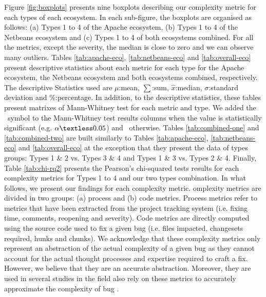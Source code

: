 Figure \ref{fig:boxplots} presents nine boxplots describing our complexity metric for each types of each ecosystem.
In each sub-figure, the boxplots are organised as follows: (a) Types 1 to 4 of the Apache ecosystem, (b) Types 1 to 4 of the Netbeans ecosystem and (c) Types 1 to 4 of both ecosystems combined.
For all the metrics, except the severity, the median is close to zero and we can observe many outliers.
Tables \ref{tab:apache-eco}, \ref{tab:netbeans-eco} and \ref{tab:overall-eco} present descriptive statistics about each metric for each type for the Apache ecosystem, the Netbeans ecosystem and both ecosystems combined, respectively.
The descriptive Statistics used are $\mu$:mean, $\sum$:sum, $\hat{x}$:median, $\sigma$:standard deviation and $\%$:percentage.
In addition, to the descriptive statistics, these tables present matrixes of Mann-Whitney test for each metric and type.
We added the \checkmark~symbol to the Mann-Whitney test results columns when the value is statistically significant (e.g. $\alpha \textless 0.05$) and \xmark~otherwise.
Tables \ref{tab:combined-one} and \ref{tab:combined-two} are built similarly to Tables \ref{tab:apache-eco}, \ref{tab:netbeans-eco} and \ref{tab:overall-eco} at the exception that they present the data of types groups: Types 1 \& 2 vs. Types 3 \& 4 and Types 1 \& 3 vs. Types 2 \& 4.
Finally, Table \ref{tab:chi-rq2} presents the Pearson's chi-squared tests results for each complexity metrics for Types 1 to 4 and our two types combination.
In what follows, we present our findings for each complexity metric.
omplexity metrics are divided in two groups: (a) process and (b) code metrics.
Process metrics refer to metrics that have been extracted from the project tracking system (i.e. fixing time, comments, reopening and severity).
Code metrics are directly computed using the source code used to fix a given bug (i.e. files impacted, changesets required, hunks and chunks).
We acknowledge that these complexity metrics only represent an abstraction of the actual complexity of a given bug as they cannot account for the actual thought processes and expertise required to craft a fix.
However, we believe that they are an accurate abstraction.
Moreover, they are used in several studies in the field also rely on these metrics to accurately approximate the complexity of bug \cite{Weiß2007,Saha2014,Nam2013,Anvik2006,Nagappan}.

